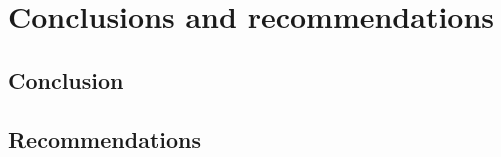 \chapter{Conclusions and recommendations}
\label{cha:conclusions}
\section{Conclusion}


\section{Recommendations}
